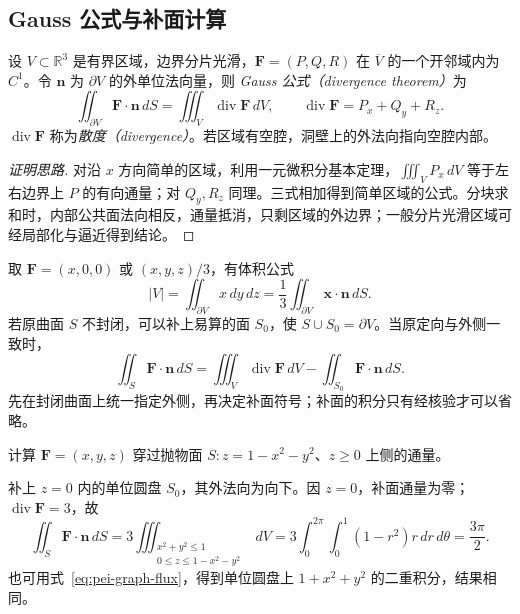 \subsection{Gauss 公式与补面计算}

\begin{theorem}
\label{thm:pei-gauss}
设 $V\subset\mathbb R^3$ 是有界区域，边界分片光滑，$\boldsymbol F=(P,Q,R)$ 在 $\overline V$ 的一个开邻域内为 $C^1$。令 $\boldsymbol n$ 为 $\partial V$ 的外单位法向量，则 \emph{Gauss 公式（divergence theorem）}为
\begin{equation}
\label{eq:pei-gauss}
\iint_{\partial V}\boldsymbol F\cdot\boldsymbol n\,dS
=\iiint_V\operatorname{div}\boldsymbol F\,dV,
\qquad
\operatorname{div}\boldsymbol F=P_x+Q_y+R_z.
\end{equation}
$\operatorname{div}\boldsymbol F$ 称为\emph{散度（divergence）}。若区域有空腔，洞壁上的外法向指向空腔内部。
\end{theorem}
\begin{proof}[证明思路]
对沿 $x$ 方向简单的区域，利用一元微积分基本定理，$\iiint_VP_x\,dV$ 等于左右边界上 $P$ 的有向通量；对 $Q_y,R_z$ 同理。三式相加得到简单区域的公式。分块求和时，内部公共面法向相反，通量抵消，只剩区域的外边界；一般分片光滑区域可经局部化与逼近得到结论。
\end{proof}

取 $\boldsymbol F=(x,0,0)$ 或 $(x,y,z)/3$，有体积公式
\[
|V|=\iint_{\partial V}x\,dy\,dz
=\frac13\iint_{\partial V}\boldsymbol x\cdot\boldsymbol n\,dS.
\]
若原曲面 $S$ 不封闭，可以补上易算的面 $S_0$，使 $S\cup S_0=\partial V$。当原定向与外侧一致时，
\[
\iint_S\boldsymbol F\cdot\boldsymbol n\,dS
=\iiint_V\operatorname{div}\boldsymbol F\,dV
-\iint_{S_0}\boldsymbol F\cdot\boldsymbol n\,dS.
\]
先在封闭曲面上统一指定外侧，再决定补面符号；补面的积分只有经核验才可以省略。

\begin{example}
\label{ex:pei-paraboloid-flux}
计算 $\boldsymbol F=(x,y,z)$ 穿过抛物面 $S:z=1-x^2-y^2$、$z\ge0$ 上侧的通量。
\end{example}
\begin{solve}
补上 $z=0$ 内的单位圆盘 $S_0$，其外法向为向下。因 $z=0$，补面通量为零；$\operatorname{div}\boldsymbol F=3$，故
\[
\iint_S\boldsymbol F\cdot\boldsymbol n\,dS
=3\iiint_{\substack{x^2+y^2\le1\\0\le z\le1-x^2-y^2}}dV
=3\int_0^{2\pi}\!\int_0^1(1-r^2)r\,dr\,d\theta
=\frac{3\pi}2.
\]
也可用式~\eqref{eq:pei-graph-flux}，得到单位圆盘上 $1+x^2+y^2$ 的二重积分，结果相同。
\end{solve}

